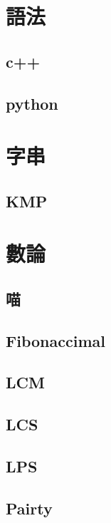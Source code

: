 \section{語法}
    \subsection{c++}
        
    \subsection{python}
        
        
\section{字串}
    \subsection{KMP}
        
    
\section{數論}
    \subsection{喵}
        
    \subsection{Fibonaccimal}
        
    \subsection{LCM}
        
    \subsection{LCS}
        
    \subsection{LPS}
        
    \subsection{Pairty}
        

